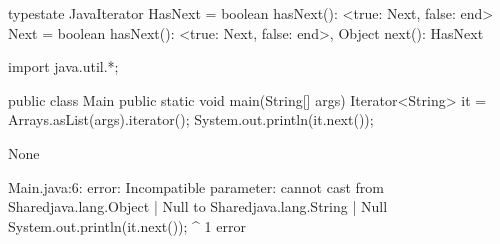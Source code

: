 \begin{code}
typestate JavaIterator {
    HasNext = {
        boolean hasNext(): <true: Next, false: end>
    }
    Next = {
        boolean hasNext(): <true: Next, false: end>,
        Object next(): HasNext
    }
}\end{code}

\begin{code}
import java.util.*;

public class Main {
	public static void main(String[] args) {
    Iterator<String> it = Arrays.asList(args).iterator();
    System.out.println(it.next());
	}
}\end{code}

\lstset{language=,caption=Mungo's output}
\begin{code}
None
\end{code}

\lstset{language=,caption=Our tool's output}
\begin{code}
Main.java:6: error: Incompatible parameter: cannot cast from Shared{java.lang.Object} | Null to Shared{java.lang.String} | Null
    System.out.println(it.next());
                              ^
1 error
\end{code}

